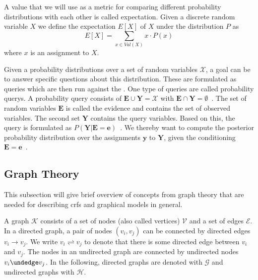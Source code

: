 \bigskip

A value that we will use as a metric for comparing different \glspl{probability distribution} with each other is called \gls{expectation}.
Given a discrete \gls{random variable} $X$ we define the expectation $E[X]$ of $X$ under the distribution $P$ as~\cite{koller2009probabilistic}
\begin{equation}
  \label{equ:expectation-x}
  E[X]=\sum_{x\in Val(X)} x\cdot P(x)
\end{equation}
where $x$ is an assignment to $X$.

\bigskip

Given a \glspl{probability distribution} over a set of \glspl{random variable} $\mathcal{X}$, a goal can be to answer specific questions about this distribution.
These are formulated as queries which are then run against the .
One type of queries are called \glspl{probability query}.
A \gls{probability query} consists of $\mathbf{E}\cup\mathbf{Y}=\mathcal{X}$ with $\mathbf{E}\cap\mathbf{Y}=\emptyset$~\citep{koller2009probabilistic}.
The set of \glspl{random variable} $\mathbf{E}$ is called the \gls{evidence} and contains the set of observed variables.
The second set $\mathbf{Y}$ contains the query variables.
Based on this, the query is formulated as $P(\mathbf{Y}|\mathbf{E}=\mathbf{e})$~\citep{koller2009probabilistic}.
We thereby want to compute the posterior \gls{probability distribution} over the assignments $\mathbf{y}$ to $\mathbf{Y}$, given the conditioning $\mathbf{E}=\mathbf{e}$~\citep{koller2009probabilistic}.

\subsection{Graph Theory}\label{subsec:graph-theory}

This subsection will give brief overview of concepts from graph theory that are needed for describing \glspl{crf} and graphical models in general.

\bigskip

A \gls{graph} $\mathcal{K}$ consists of a set of \glspl{node} (also called vertices) $\mathcal{V}$ and a set of \glspl{edge} $\mathcal{E}$.
In a directed \gls{graph}, a pair of \glspl{node} $(v_i,v_j)$ can be connected by directed \glspl{edge} $v_i\to v_j$.
We write $v_i\rightleftharpoons v_j$ to denote that there is some directed edge between $v_i$ and $v_j$.
The \glspl{node} in an undirected graph are connected by undirected \glspl{node} $v_i\undedge v_j$.
In the following, directed \glspl{graph} are denoted with $\mathcal{G}$ and undirected \glspl{graph} with $\mathcal{H}$.

